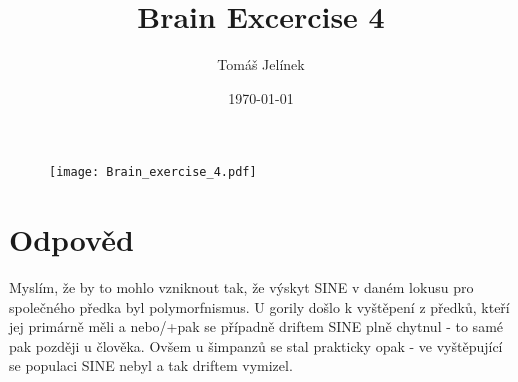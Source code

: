 \documentclass{article}
\title{Brain Excercise 4}
\author{Tomáš Jelínek}
\date{\today}
\begin{document}
\maketitle

\begin{figure}[h]
    \centering
    \texttt{[image: Brain\_exercise\_4.pdf]}
\end{figure}

\section*{Odpověd}

Myslím, že by to mohlo vzniknout tak, že výskyt SINE v daném lokusu pro společného předka byl polymorfnismus. U gorily došlo k vyštěpení z předků, kteří jej primárně měli a nebo/+pak se případně driftem SINE plně chytnul - to samé pak později u člověka.
Ovšem u šimpanzů se stal prakticky opak - ve vyštěpující se populaci SINE nebyl a tak driftem vymizel. 
\end{document}

